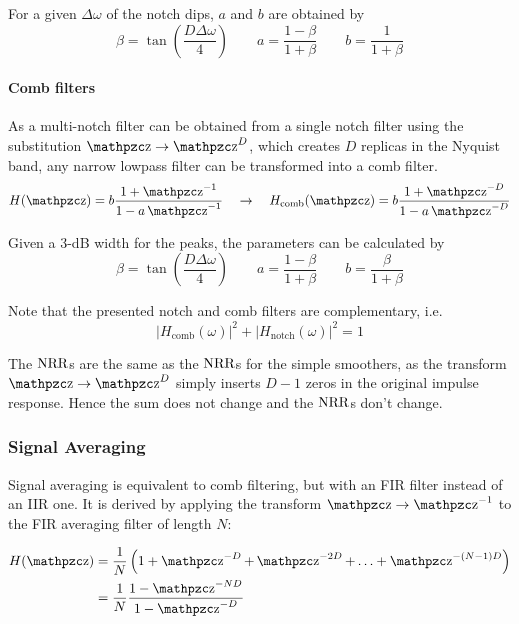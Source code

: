 For a given $\Delta\omega$ of the notch dips, $a$ and $b$  are obtained by
\begin{equation*}
	\beta = \tan\left(\frac{D\Delta\omega}{4}\right) \qquad a = \frac{1-\beta}{1+\beta} \qquad b = \frac{1}{1+\beta}
\end{equation*}

\paragraph{Comb filters}
As a multi-notch filter can be obtained from a single notch filter using the
substitution $\z \to \z^D$, which creates $D$ replicas in the Nyquist band,
any narrow lowpass filter can be transformed into a comb filter.
\begin{equation*}
	H(\z) = b \frac{1+\z^{-1}}{1-a\z^{-1}} \quad \to \quad
	H_{\text{comb}}(\z) = b \frac{1+\z^{-D}}{1-a\z^{-D}}
\end{equation*}

Given a 3-dB width for the peaks, the parameters can be calculated by
\begin{equation*}
	\beta = \tan\left(\frac{D\Delta\omega}{4}\right) \qquad
	a = \frac{1-\beta}{1+\beta} \qquad b = \frac{\beta}{1+\beta}
\end{equation*}

Note that the presented notch and comb filters are complementary, i.e.
\begin{equation*}
	\left|H_{\text{comb}}(\omega)\right|^2 + \left|H_{\text{notch}}(\omega)\right|^2 = 1
\end{equation*}

The $\operatorname{\text{NRR}}$s are the same as the $\operatorname{\text{NRR}}$s for the simple smoothers, as the
transform $\z \to \z^{D}$ simply inserts $D-1$ zeros in the original
impulse response. Hence the sum does not change and the $\operatorname{\text{NRR}}$s don't change.


\subsubsection{Signal Averaging}
Signal averaging is equivalent to comb filtering, but with an FIR filter
instead of an IIR one. It is derived by applying the transform $\z \to \z^{-1}$
to the FIR averaging filter of length $N$:

\begin{align*}
	H(\z)&=\frac{1}{N}\left( 1+ \z^{-D}+\z^{-2D}+\ldots + \z^{-(N-1)D} \right) \\
	&= \frac{1}{N}\frac{1-\z^{-ND}}{1-\z^{-D}}
\end{align*}

